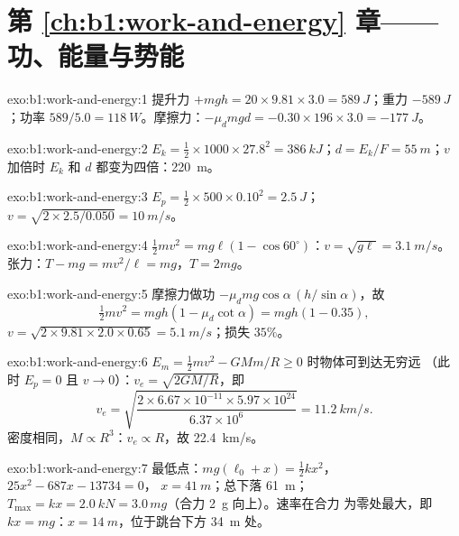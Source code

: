 \section*{第 \ref{ch:b1:work-and-energy} 章——功、能量与势能}

\begin{solution}{exo:b1:work-and-energy:1}
提升力 $+mgh = 20 \times 9.81 \times 3.0 = \qty{589}{J}$；重力
$-\qty{589}{J}$；功率 $589/5.0 = \qty{118}{W}$。摩擦力：$-\mu_dmgd =
-0.30 \times 196 \times 3.0 = \qty{-177}{J}$。
\end{solution}

\begin{solution}{exo:b1:work-and-energy:2}
$E_k = \tfrac12 \times 1000 \times 27.8^2 = \qty{386}{kJ}$；$d = E_k/F =
\qty{55}{m}$；$v$ 加倍时 $E_k$ 和 $d$ 都变为四倍：\qty{220}{m}。
\end{solution}

\begin{solution}{exo:b1:work-and-energy:3}
$E_p = \tfrac12 \times 500 \times 0.10^2 = \qty{2.5}{J}$；$v = \sqrt{2 \times
2.5/0.050} = \qty{10}{m/s}$。
\end{solution}

\begin{solution}{exo:b1:work-and-energy:4}
$\tfrac12 mv^2 = mg\ell(1 - \cos 60^\circ)$：$v = \sqrt{g\ell} = \qty{3.1}{m/s}$。
张力：$T - mg = mv^2/\ell = mg$，$T = 2mg$。
\end{solution}

\begin{solution}{exo:b1:work-and-energy:5}
摩擦力做功 $-\mu_dmg\cos\alpha\,(h/\sin\alpha)$，故
\[
\tfrac12 mv^2 = mgh(1 - \mu_d\cot\alpha) = mgh(1 - 0.35),
\]
$v = \sqrt{2 \times 9.81 \times 2.0 \times 0.65} = \qty{5.1}{m/s}$；损失 $35\%$。
\end{solution}

\begin{solution}{exo:b1:work-and-energy:6}
$E_m = \tfrac12 mv^2 - GMm/R \geq 0$ 时物体可到达无穷远
（此时 $E_p = 0$ 且 $v \to 0$）：$v_e = \sqrt{2GM/R}$，即
\[
v_e = \sqrt{\frac{2 \times 6.67\times10^{-11} \times 5.97\times10^{24}}{6.37\times10^6}}
= \qty{11.2}{km/s}.
\]
密度相同，$M \propto R^3$：$v_e \propto R$，故 \qty{22.4}{km/s}。
\end{solution}

\begin{solution}{exo:b1:work-and-energy:7}
最低点：$mg(\ell_0 + x) = \tfrac12 kx^2$，$25x^2 - 687x - 13734 = 0$，
$x = \qty{41}{m}$；总下落 \qty{61}{m}；$T_{\max} = kx = \qty{2.0}{kN}
= 3.0\,mg$（合力 \qty{2}{g} 向上）。速率在合力
为零处最大，即 $kx = mg$：$x = \qty{14}{m}$，位于跳台下方 \qty{34}{m} 处。
\end{solution}


